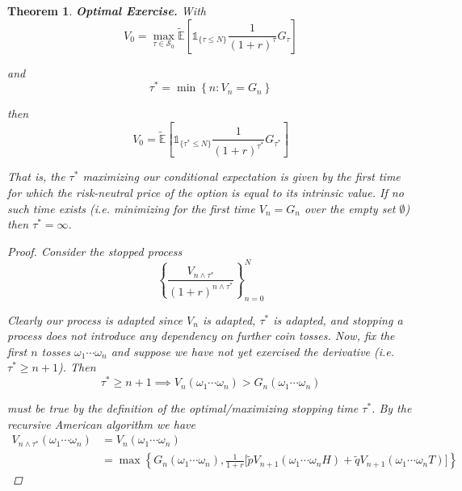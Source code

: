 \documentclass[12pt]{article}
\newtheorem{theorem}{Theorem}
\newlength\tindent
\renewcommand{\indent}{\hspace*{\tindent}}
\newcommand{\E}{\mathbb E}
\begin{document}
\begin{theorem} {\bf Optimal Exercise.} With
\begin{equation*}
	V_0 = \max_{\tau\in\mathcal S_0} \tilde{\E} \left[ \mathds 1_{\{\tau \leq N\}} \frac{1}{(1 + r)^\tau} G_\tau \right]
\end{equation*}

and
\begin{equation*}
	\tau^* = \min \left\{n:V_n = G_n\right\}
\end{equation*}

then
\begin{equation*}
	V_0 = \tilde{\E} \left[ \mathds 1_{\{\tau^* \leq N\}} \frac{1}{(1 + r)^{\tau^*}} G_{\tau^*} \right]
\end{equation*}

\indent That is, the $\tau^*$ maximizing our conditional expectation is given by the first time for which the risk-neutral price of the option is equal to its intrinsic value. If no such time exists (i.e. minimizing for the first time $V_n = G_n$ over the empty set $\emptyset$) then $\tau^* = \infty$.

\begin{proof} Consider the stopped process 
\begin{equation*}
	\left\{ \frac{V_{n\land\tau^*} }{(1 + r)^{n\land\tau^*}} \right\}^N_{n = 0}
\end{equation*}

\indent Clearly our process is adapted since $V_n$ is adapted, $\tau^*$ is adapted, and stopping a process does not introduce any dependency on further coin tosses. Now, fix the first $n$ tosses $\omega_1\cdots\omega_n$ and suppose we have not yet exercised the derivative (i.e. $\tau^* \geq n + 1$). Then
\begin{equation*}
	\tau^* \geq n + 1 \implies V_n(\omega_1\cdots\omega_n) > G_n(\omega_1\cdots\omega_n)
\end{equation*}

must be true by the definition of the optimal/maximizing stopping time $\tau^*$. By the recursive American algorithm we have
\begin{align*}
	V_{n\land\tau^*}(\omega_1\cdots\omega_n) &= V_n(\omega_1\cdots\omega_n) \\
	&= \max \left\{ G_n(\omega_1\cdots\omega_n), \frac{1}{1 + r}\Big[\tilde{p}V_{n + 1}(\omega_1\cdots\omega_nH) + \tilde{q}V_{n + 1}(\omega_1\cdots\omega_nT) \Big]\right\}
\end{align*}


\end{proof}
\end{theorem}
\end{document}
